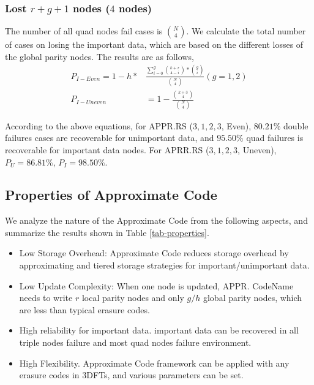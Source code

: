 \documentclass[sigconf]{acmart}
\begin{document}
\subsubsection{Lost $r+g+1$ nodes ($4$ nodes)}
The number of all quad nodes fail cases is $\binom{N}{4}$.
We calculate the total number of cases on losing the important data, which are based on the different losses of the global parity nodes. The results are as follows,
\begin{align}
    P_{I-Even} = 1 - h*&\frac{\sum_{i=0}^{g} {\binom{k+r}{4-i}*\binom{g}{i}} }{\binom{N}{4}}  (g=1,2)\\
    P_{I-Uneven} &= 1 - \frac{\binom{k+3}{4}}{\binom{N}{4}}
\end{align}

According to the above equations, for APPR.RS ($3,1,2,3$, Even), $80.21\%$ double failures cases are recoverable for unimportant data, and $95.50\%$ quad failures is recoverable for important data nodes. For APRR.RS ($3,1,2,3$, Uneven), $P_U=86.81\%$, $P_{I}=98.50\%$.


\subsection{Properties of Approximate Code}\label{properties}

We analyze the nature of the Approximate Code from the following aspects, and summarize the results shown in Table \ref{tab-properties}.
\begin{itemize}
    \item Low Storage Overhead: Approximate Code reduces storage overhead by approximating and tiered storage strategies for important/unimportant data. 
    \item Low Update Complexity: When one node is updated, APPR. CodeName needs to write $r$ local parity nodes and only $g/h$ global parity nodes, which are less than typical erasure codes.
    \item High reliability for important data. important data can be recovered in all triple nodes failure and most quad nodes failure environment.
    \item High Flexibility. Approximate Code framework can be applied with any erasure codes in 3DFTs, and various parameters can be set.
\end{itemize}
\end{document}
